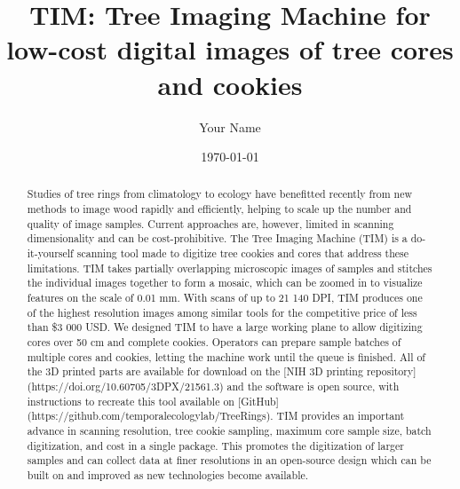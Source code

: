 \documentclass[a4paper,12pt]{article}
\title{TIM: Tree Imaging Machine for low-cost digital images of tree cores and cookies}
\author{Your Name}
\date{\today}
\begin{document}
\maketitle


\begin{abstract}  
Studies of tree rings from climatology to ecology have benefitted recently from new methods to image wood rapidly and efficiently, helping to scale up the number and quality of image samples. Current approaches are, however, limited in scanning dimensionality and can be cost-prohibitive. %
The Tree Imaging Machine (TIM) is a do-it-yourself scanning tool made to digitize tree cookies and cores that address these limitations. TIM takes partially overlapping microscopic images of samples and stitches the individual images together to form 
a mosaic, which can be zoomed in to visualize features on the scale of 0.01 mm. With scans of up to 21 140 DPI, TIM produces one of the highest resolution images among similar tools for the competitive price of less than \$3 000 USD.
We designed TIM to have a large working plane to allow digitizing cores over 50 cm and complete cookies. Operators can prepare sample batches of multiple cores and cookies, letting the machine work until the queue is finished.
All of the 3D printed parts are available for download on the [NIH 3D printing repository](https://doi.org/10.60705/3DPX/21561.3) and the software is  %
open source, with instructions to recreate this tool available on [GitHub](https://github.com/temporalecologylab/TreeRings). TIM provides an important advance in scanning resolution, tree cookie sampling, maximum core sample size, batch digitization, and cost in a single package. This promotes the digitization of larger samples and can collect data at finer resolutions in an open-source design which can be built on and improved as new technologies become available. %
\end{abstract}
\end{document}

